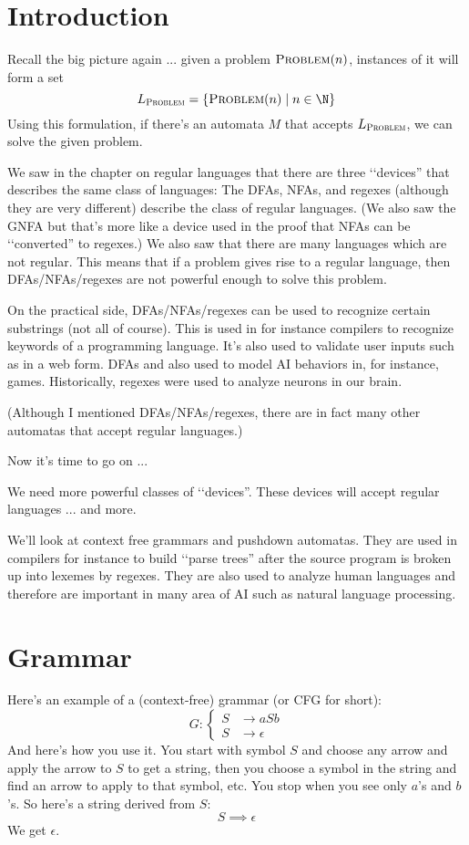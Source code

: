 \section{Introduction}

Recall the big picture again ... given a problem 
$\text{\textsc{Problem}}(n)$, instances of it
will form a set 
\[
L_{\text{\textsc{Problem}}} = 
\{ 
\text{\textsc{Problem}}(n) \mid n \in \N
\}
\]
Using this formulation, if there's an automata $M$ that accepts
$L_{\text{\textsc{Problem}}}$, we can solve the given problem.

We saw in the chapter on regular languages that
there are three \lq\lq devices'' that describes the
same class of languages:
The DFAs, NFAs, and regexes (although they are very different) describe
the class of regular languages.
(We also saw the GNFA but that's more like a device used in the proof
that NFAs can be \lq\lq converted'' to regexes.)
We also saw that there are many languages which are not regular.
This means that if a problem gives rise to a regular language, then
DFAs/NFAs/regexes are not powerful enough to solve this problem.

On the practical side, DFAs/NFAs/regexes can be used to 
recognize certain substrings (not all of course).
This is used in for instance compilers to recognize keywords of a 
programming language.
It's also used to validate user inputs such as in a web form.
DFAs and also used to model AI behaviors in, for instance, games.
Historically, regexes were used to analyze neurons in our brain.

(Although I mentioned DFAs/NFAs/regexes, there are in fact many 
other automatas that accept regular languages.)

Now it's time to go on ...

We need more powerful classes of \lq\lq devices''.
These devices will accept regular languages ... and more.

We'll look at context free grammars and pushdown automatas.
They are used in compilers for instance to build \lq\lq parse trees''
after the source program is broken up into lexemes by regexes.
They are also used to analyze human languages and therefore are
important in many area of AI such as natural language processing.

\newpage
\section{Grammar}

Here's an example of a (context-free) grammar (or CFG for short):
\[
G :
\begin{cases}
S &\rightarrow aSb \\
S &\rightarrow \epsilon
\end{cases}
\]
And here's how you use it.
You start with symbol $S$ and choose any arrow and apply the arrow to $S$
to get a string, then you choose a symbol in the string and find an arrow to
apply to that symbol, etc.
You stop when you see only $a$'s and $b$'s.
So here's a string derived from $S$:
\[
S \implies \epsilon
\]
We get $\epsilon$.


